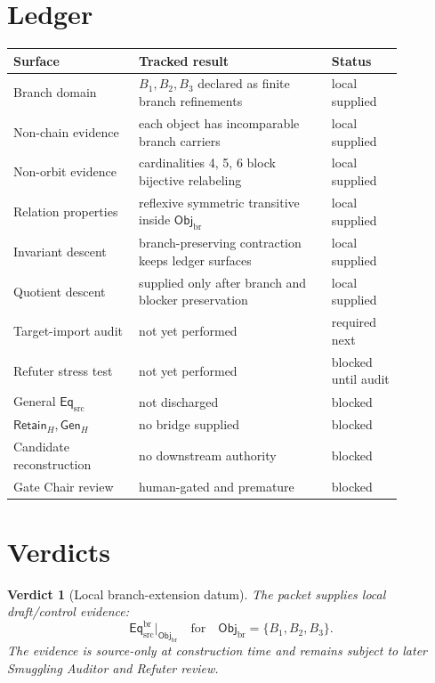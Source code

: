 \documentclass[11pt]{article}
\newcommand{\EqSrc}{\mathsf{Eq}_{\mathrm{src}}}
\newcommand{\EqBr}{\mathsf{Eq}_{\mathrm{src}}^{\mathrm{br}}}
\newcommand{\ObjBr}{\mathsf{Obj}_{\mathrm{br}}}
\newcommand{\RetainH}{\mathsf{Retain}_{H}}
\newcommand{\GenH}{\mathsf{Gen}_{H}}
\newtheorem{verdict}{Verdict}
\begin{document}
\section{Ledger}

\begin{center}
\begin{tabular}{p{0.28\linewidth}p{0.43\linewidth}p{0.16\linewidth}}
\textbf{Surface} & \textbf{Tracked result} & \textbf{Status} \\
\hline
Branch domain & \(B_{1},B_{2},B_{3}\) declared as finite branch refinements & local supplied \\
Non-chain evidence & each object has incomparable branch carriers & local supplied \\
Non-orbit evidence & cardinalities 4, 5, 6 block bijective relabeling & local supplied \\
Relation properties & reflexive symmetric transitive inside \(\ObjBr\) & local supplied \\
Invariant descent & branch-preserving contraction keeps ledger surfaces & local supplied \\
Quotient descent & supplied only after branch and blocker preservation & local supplied \\
Target-import audit & not yet performed & required next \\
Refuter stress test & not yet performed & blocked until audit \\
General \(\EqSrc\) & not discharged & blocked \\
\(\RetainH,\GenH\) & no bridge supplied & blocked \\
Candidate reconstruction & no downstream authority & blocked \\
Gate Chair review & human-gated and premature & blocked \\
\end{tabular}
\end{center}

\section{Verdicts}

\begin{verdict}[Local branch-extension datum]
The packet supplies local draft/control evidence:
\[
    \EqBr\big|_{\ObjBr}
    \quad\text{for}\quad
    \ObjBr=\{B_{1},B_{2},B_{3}\}.
\]
The evidence is source-only at construction time and remains subject to
later Smuggling Auditor and Refuter review.
\end{verdict}
\end{document}
